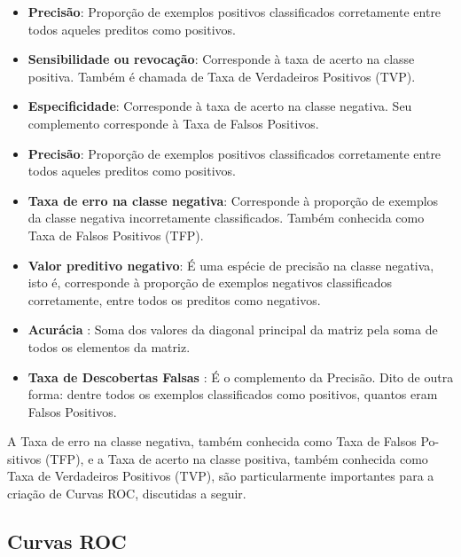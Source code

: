 \documentclass[openright]{UFRGS} %
\begin{document}
\begin{itemize}
 \item\textbf{Precisão}: Proporção  de exemplos positivos classificados corretamente entre todos aqueles preditos como positivos.
 
 
 \item\textbf{Sensibilidade ou revocação}: Corresponde à taxa de acerto na classe positiva. Também é chamada de Taxa de Verdadeiros Positivos (TVP).
 
 
 \item\textbf{Especificidade}: Corresponde à taxa de acerto na classe negativa. Seu complemento corresponde à Taxa de Falsos Positivos.
 
 
 
 \item\textbf{Precisão}: 
 Proporção de exemplos positivos classificados corretamente entre todos aqueles
preditos como positivos.
 
 \item\textbf{Taxa de erro na classe negativa}: 
  Corresponde à proporção de exemplos da classe negativa incorretamente classificados. Também conhecida como Taxa de Falsos Positivos (TFP).


  
 \item\textbf{Valor preditivo negativo}: 
  É uma espécie de precisão na classe negativa, isto é, corresponde à proporção de exemplos negativos classificados corretamente, entre todos os preditos como negativos.
 
 \item\textbf{Acurácia} :  Soma dos valores da diagonal principal da matriz pela soma de todos os elementos da matriz.
  
 \item\textbf{Taxa de Descobertas Falsas } : 
   É o complemento da Precisão. Dito de outra forma: dentre todos os exemplos classificados como positivos, quantos eram Falsos Positivos.
\end{itemize}


A Taxa de erro na classe negativa, também conhecida como Taxa de Falsos Po-
sitivos (TFP), e a Taxa de acerto na classe positiva, também conhecida como Taxa de
Verdadeiros Positivos (TVP), são particularmente importantes para a criação de Curvas
ROC, discutidas a seguir.

\subsection{Curvas ROC}
\end{document}
